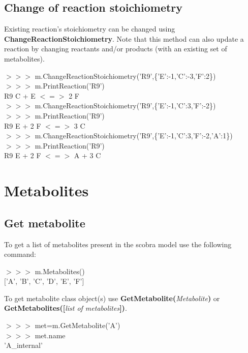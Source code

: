 \subsection{Change of reaction stoichiometry}
Existing reaction's stoichiometry can be changed using \textbf{ChangeReactionStoichiometry}. Note that this method can also update a reaction by changing reactants and/or products (with an existing set of metabolites).

\begin{framed}
$>>>$ m.ChangeReactionStoichiometry('R9',\{'E':-1,'C':-3,'F':2\})\\
$>>>$ m.PrintReaction('R9')\\
R9  C + E $<=>$ 2 F\\

$>>>$ m.ChangeReactionStoichiometry('R9',\{'E':-1,'C':3,'F':-2\})\\
$>>>$ m.PrintReaction('R9')\\
R9 \space E + 2 F $<=>$ 3 C\\

$>>>$ m.ChangeReactionStoichiometry('R9',\{'E':-1,'C':3,'F':-2,'A':1\})\\
$>>>$ m.PrintReaction('R9')\\
R9 \space E + 2 F $<=>$ A + 3 C
\end{framed}


\section{Metabolites}

\subsection{Get metabolite}

To get a list of metabolites present in the scobra model use the following command:
\begin{framed}
$>>>$ m.Metabolites()\\
$[$'A', 'B', 'C', 'D', 'E', 'F'$]$
\end{framed}

To get metabolite class object(s) use \textbf{GetMetabolite(}\textit{Metabolite}\textbf{)} or \textbf{GetMetabolites([}\textit{list of metabolites}\textbf{])}.

\begin{framed}
$>>>$ met=m.GetMetabolite('A')\\
$>>>$ met.name\\
'A\_internal'
\end{framed}

